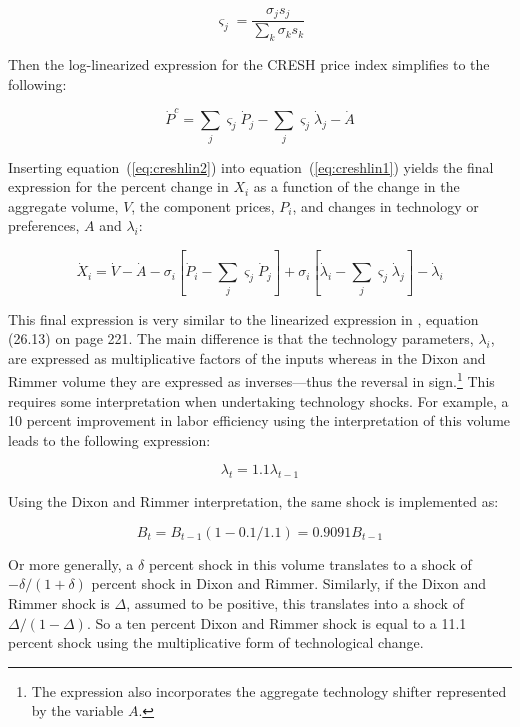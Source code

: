 \begin{equation}
\label{eq:creshadj}
\varsigma_j = \frac{\sigma_j s_j} {\sum_k{\sigma_k s_k}}
\end{equation}

\noindent Then the log-linearized expression for the CRESH price index simplifies to the
following:

\begin{equation}
\label{eq:creshlin2}
\dot P^c = \sum_j {\varsigma_j \dot P_j} - \sum_j {\varsigma_j \dot \lambda_j} - \dot A
\end{equation}

\noindent Inserting equation~(\ref{eq:creshlin2}) into equation~(\ref{eq:creshlin1})
yields the final expression for the percent change in $X_i$ as
a function of the change in the aggregate volume, $V$, the component
prices, $P_i$, and changes in technology or preferences, $A$ and $\lambda_i$:

\begin{equation}
\label{eq:creshlinfinal}
\dot X_i = \dot V - \dot A
	-\sigma_i \left[\dot P_i - \sum_j{\varsigma_j\dot P_j} \right]
	+ \sigma_i \left[ \dot \lambda_i - \sum_j{\varsigma_j\dot \lambda_j}\right]
	- \dot \lambda_i
\end{equation}

This final expression is very similar to the linearized expression
in \cite{DixonRimmer2002}, equation (26.13) on page 221. The main
difference is that the technology parameters, $\lambda_i$, are expressed
as multiplicative factors of the inputs whereas in the Dixon and
Rimmer volume they are expressed as inverses---thus the reversal in
sign.\footnote{The expression also incorporates the aggregate
technology shifter represented by the variable $A$.}
This requires some interpretation when undertaking technology
shocks. For example, a 10 percent improvement in labor efficiency
using the interpretation of this volume leads to the following expression:

\begin{displaymath}
\lambda_t = 1.1 \lambda_{t-1}
\end{displaymath}

\noindent Using  the Dixon and Rimmer interpretation, the
same shock is implemented as:

\begin{displaymath}
B_t = B_{t-1} (1 - 0.1/1.1)=0.9091 B_{t-1}
\end{displaymath}

\noindent Or more generally, a $\delta$ percent shock in this volume translates
to a shock of $-\delta/(1+\delta)$ percent shock in Dixon and Rimmer. Similarly,
if the Dixon and Rimmer shock is $\Delta$, assumed to be positive,
this translates into a shock of $\Delta/(1-\Delta)$. So
a ten percent Dixon and Rimmer shock is equal to a 11.1 percent shock
using the multiplicative form of technological change.

